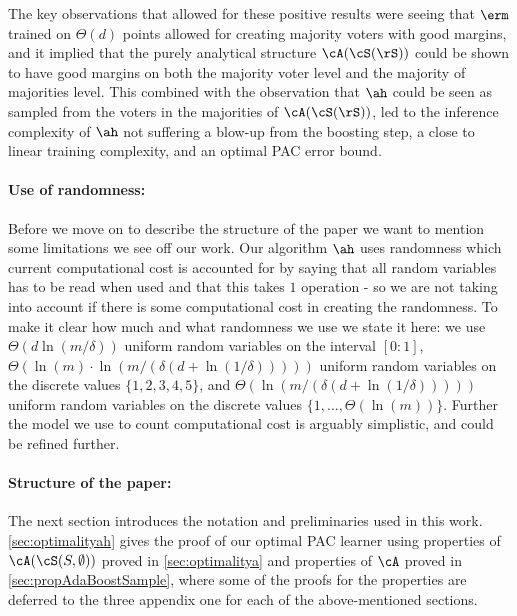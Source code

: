 The key observations that allowed for these positive results were seeing that $ \erm $ trained on $ \Theta(d) $ points allowed for creating majority voters with good margins, and it implied that the purely analytical structure $ \cA(\cS(\rS)) $ could be shown to have good margins on both the majority voter level and the majority of majorities level. This combined with the observation that $ \ah $ could be seen as sampled from the voters in the majorities of $ \cA(\cS(\rS)) $, led to the inference complexity of $\ah$ not suffering a blow-up from the boosting step, a close to linear training complexity, and an optimal PAC error bound. 

\paragraph{Use of randomness:}Before we move on to describe the structure of the paper we want to mention some limitations we see off our work. Our algorithm $ \ah $ uses randomness which current computational cost is accounted for by saying that all random variables has to be read when used and that this takes $ 1 $ operation - so we are not taking into account if there is some computational cost in creating the randomness. To make it clear how much and what randomness we use we state it here: we use $ \Theta(d\ln{(m/\delta)}) $ uniform random variables on the interval $ [0:1] $,  $ \Theta(\ln{(m )}\cdot\ln{(m/(\delta(d+\ln{(1/\delta )})) )})$ uniform random variables on the discrete values  $ \{ 1,2,3,4,5 \} $, and $ \Theta(\ln{(m/(\delta(d+\ln{(1/\delta )})) )})$  uniform random variables on the discrete values $ \{ 1,\ldots,\Theta(\ln{(m )}) \} $. Further the model we use to count computational cost is arguably simplistic, and could be refined further.     

\paragraph{Structure of the paper:}The next section introduces the notation and preliminaries used in this work. \cref{sec:optimalityah} gives the proof of our optimal PAC learner using properties of $ \cA(\cS(S,\emptyset)) $ proved in \cref{sec:optimalitya} and properties of $ \cA $ proved in \cref{sec:propAdaBoostSample}, where some of the proofs for the properties are deferred to the three appendix one for each of the above-mentioned sections.